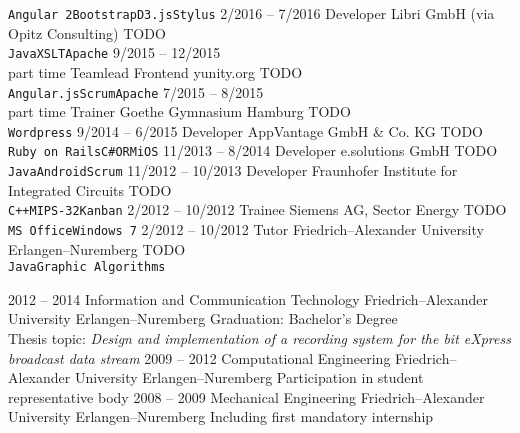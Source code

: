 \documentclass[9pt]{developercv} %
\begin{document}
\begin{entrylist}
{      \texttt{Angular 2}\slashsep\texttt{Bootstrap}\slashsep\texttt{D3.js}\slashsep\texttt{Stylus}
    }
  \entry
		{2/2016 -- 7/2016}
		{Developer}
		{Libri GmbH (via Opitz Consulting)}
		{
      TODO\\
      \texttt{Java}\slashsep\texttt{XSLT}\slashsep\texttt{Apache}
    }
  \entry
		{9/2015 -- 12/2015\\\footnotesize{part time}}
		{Teamlead Frontend}
		{yunity.org}
		{
      TODO\\
      \texttt{Angular.js}\slashsep\texttt{Scrum}\slashsep\texttt{Apache}
    }
  \entry
		{7/2015 -- 8/2015\\\footnotesize{part time}}
		{Trainer}
		{Goethe Gymnasium Hamburg}
		{
      TODO\\
      \texttt{Wordpress}
    }
  \entry
		{9/2014 -- 6/2015}
		{Developer}
		{AppVantage GmbH \& Co. KG}
		{
      TODO\\
      \texttt{Ruby on Rails}\slashsep\texttt{C\#}\slashsep\texttt{ORM}\slashsep\texttt{iOS}
    }
  \entry
		{11/2013 -- 8/2014}
		{Developer}
		{e.solutions GmbH}
		{
      TODO\\
      \texttt{Java}\slashsep\texttt{Android}\slashsep\texttt{Scrum}
    }
  \entry
		{11/2012 -- 10/2013}
		{Developer}
		{Fraunhofer Institute for Integrated Circuits}
		{
      TODO\\
      \texttt{C++}\slashsep\texttt{MIPS-32}\slashsep\texttt{Kanban}
    }
  \entry
		{2/2012 -- 10/2012}
		{Trainee}
		{Siemens AG, Sector Energy}
		{
      TODO\\
      \texttt{MS Office}\slashsep\texttt{Windows 7}
    }
  \entry
		{2/2012 -- 10/2012}
		{Tutor}
		{Friedrich–Alexander University Erlangen–Nuremberg}
		{
      TODO\\
      \texttt{Java}\slashsep\texttt{Graphic Algorithms}
    }
\end{entrylist}



\begin{entrylist}
	\entry
		{2012 -- 2014}
		{Information and Communication Technology}
		{Friedrich–Alexander University Erlangen–Nuremberg}
		{
      Graduation: Bachelor's Degree\\
      Thesis topic: \textit{Design and implementation of a recording system for the bit eXpress broadcast data stream}
      }
	\entry
		{2009 -- 2012}
		{Computational Engineering}
		{Friedrich–Alexander University Erlangen–Nuremberg}
		{Participation in student representative body}
	\entry
		{2008 -- 2009}
		{Mechanical Engineering}
		{Friedrich–Alexander University Erlangen–Nuremberg}
		{Including first mandatory internship}
\end{entrylist}
\end{document}
